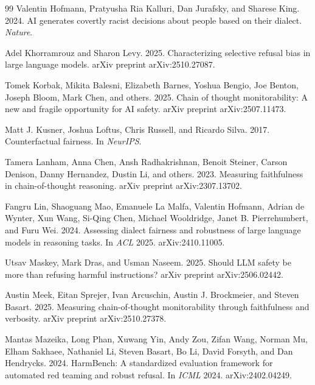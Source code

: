 \documentclass[10pt,a4paper,twocolumn]{article}
\begin{document}
\begin{thebibliography}{99}
Valentin Hofmann, Pratyusha Ria Kalluri, Dan Jurafsky, and Sharese King. 2024. AI generates covertly racist decisions about people based on their dialect. \emph{Nature}.

Adel Khorramrouz and Sharon Levy. 2025. Characterizing selective refusal bias in large language models. arXiv preprint arXiv:2510.27087.

Tomek Korbak, Mikita Balesni, Elizabeth Barnes, Yoshua Bengio, Joe Benton, Joseph Bloom, Mark Chen, and others. 2025. Chain of thought monitorability: A new and fragile opportunity for AI safety. arXiv preprint arXiv:2507.11473.

Matt J. Kusner, Joshua Loftus, Chris Russell, and Ricardo Silva. 2017. Counterfactual fairness. In \emph{NeurIPS}.

Tamera Lanham, Anna Chen, Ansh Radhakrishnan, Benoit Steiner, Carson Denison, Danny Hernandez, Dustin Li, and others. 2023. Measuring faithfulness in chain-of-thought reasoning. arXiv preprint arXiv:2307.13702.

Fangru Lin, Shaoguang Mao, Emanuele La Malfa, Valentin Hofmann, Adrian de Wynter, Xun Wang, Si-Qing Chen, Michael Wooldridge, Janet B. Pierrehumbert, and Furu Wei. 2024. Assessing dialect fairness and robustness of large language models in reasoning tasks. In \emph{ACL} 2025. arXiv:2410.11005.

Utsav Maskey, Mark Dras, and Usman Naseem. 2025. Should LLM safety be more than refusing harmful instructions? arXiv preprint arXiv:2506.02442.

Austin Meek, Eitan Sprejer, Ivan Arcuschin, Austin J. Brockmeier, and Steven Basart. 2025. Measuring chain-of-thought monitorability through faithfulness and verbosity. arXiv preprint arXiv:2510.27378.

Mantas Mazeika, Long Phan, Xuwang Yin, Andy Zou, Zifan Wang, Norman Mu, Elham Sakhaee, Nathaniel Li, Steven Basart, Bo Li, David Forsyth, and Dan Hendrycks. 2024. HarmBench: A standardized evaluation framework for automated red teaming and robust refusal. In \emph{ICML} 2024. arXiv:2402.04249.


\end{thebibliography}
\end{document}
